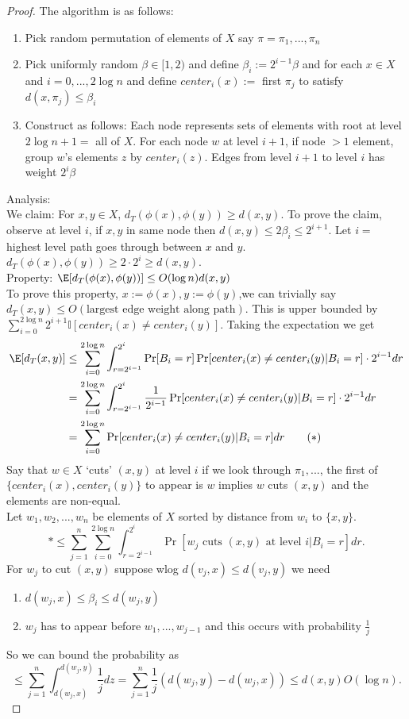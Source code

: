 \documentclass[a4paper]{article}
\begin{document}
\begin{proof}
    The algorithm is as follows:
    \begin{enumerate}
        \item Pick random permutation of elements of $X$ say $\pi=\pi_1,...,\pi_n$
        \item Pick uniformly random $\beta\in [1,2)$ and define $\beta_i:=2^{i-1}\beta$ and for each $x\in X$ and $i=0,...,2\log n$ and define $center_i(x):=$ first $\pi_j$ to satisfy $d(x,\pi_j)\leq \beta_i$
        \item Construct as follows: Each node represents sets of elements with root at level $2\log n+1=$ all of $X$. For each node $w$ at level $i+1$, if node $>1$ element, group $w$'s elements $z$ by $center_i(z)$. Edges from level $i+1$ to level $i$ has weight $2^{i}\beta$
    \end{enumerate}
    Analysis:\\
    We claim: For $x,y\in X$, $d_T(\phi(x),\phi(y))\geq d(x,y)$.
    To prove the claim, observe at level $i$, if $x,y$ in same node then $d(x,y)\leq 2\beta_i\leq 2^{i+1}$. Let $i=$ highest level path goes through between $x$ and $y$. $d_T(\phi(x),\phi(y))\geq 2\cdot 2^i\geq d(x,y)$. \\
    Property: $\E[d_T(\phi(x),\phi(y))]\leq O(\log n)d(x,y)$\\
    To prove this property, $x:=\phi(x), y:=\phi(y)$,we can trivially say $d_T(x,y)\leq O( \text{largest edge weight along path})$. This is upper bounded by $\sum_{i=0}^{2\log n} 2^{i+1} \mathbb{I}[center_i(x)\neq center_i(y)]$. Taking the expectation we get 
    \begin{align*}
        \E[d_T(x,y)]&\leq \sum_{i=0}^{2\log n} \int_{r=2^{i-1}}^{2^i} \Pr[B_i=r]\Pr[center_i(x)\neq center_i(y)|B_i=r]\cdot 2^{i-1}dr\\
        &=\sum_{i=0}^{2\log n} \int_{r=2^{i-1}}^{2^i} \frac{1}{2^{i-1}}\Pr[center_i(x)\neq center_i(y)|B_i=r]\cdot 2^{i-1}dr\\
        &=\sum_{i=0}^{2\log n} \Pr[center_i(x)\neq center_i(y)|B_i=r]dr \tag{$*$}
     \end{align*}
    Say that $w\in X$ `cuts' $(x,y)$ at level $i$ if we look through $\pi_1,...$, the first of $ \{center_i(x),center_i(y)\}$ to appear is $w$ implies $w$ cuts $(x,y)$ and the elements are non-equal. \\
    Let $w_1,w_2,...,w_n$ be elements of $X$ sorted by distance from $w_i$ to $ \{x,y\}$. 
    \[
    *\leq \sum_{j=1}^{n}\sum_{i=0}^{2\log n}\int_{r=2^{i-1}}^{2^i}\Pr[w_j\text{ cuts } (x,y) \text{ at level } i|B_i=r]dr
    .\] 
    For $w_j$ to cut $(x,y)$ suppose wlog $d(v_j,x)\leq d(v_j,y)$ we need 
    \begin{enumerate}
        \item $d(w_j,x)\leq \beta_i\leq d(w_j,y)$ 
        \item $w_j$ has to appear before $w_1,...,w_{j-1}$ and this occurs with probability $\frac{1}{j}$
    \end{enumerate}
    So we can bound the probability as \[
    \leq \sum_{j=1}^n \int_{d(w_j,x)}^{d(w_j,y)} \frac{1}{j}dz=\sum_{j=1}^n \frac{1}{j}\left( d(w_j,y)-d(w_j,x) \right)\leq d(x,y) O(\log n) 
    .\] 
\end{proof}
\newpage
\end{document}

